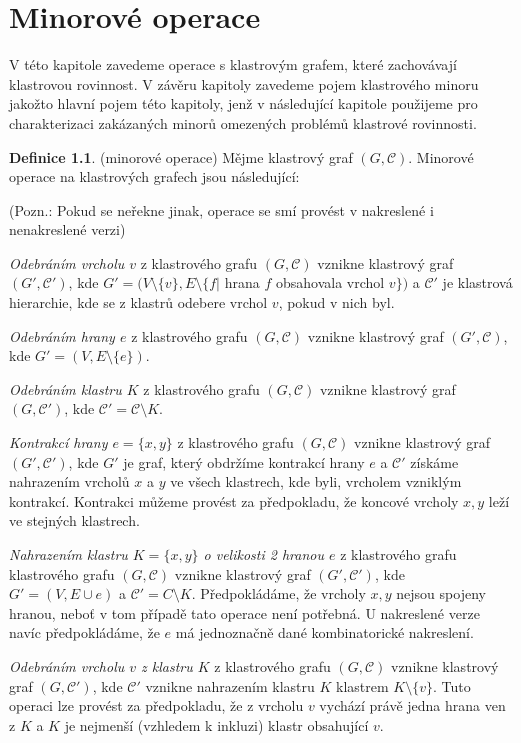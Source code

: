 \documentclass[12pt,a4report]{report}
\theoremstyle{definition}
\newtheorem{defn}[theorem]{Definice}
\begin{document}
\author{Filip Šedivý}

\chapter{Minorové operace}

V této kapitole zavedeme operace s klastrovým grafem, které zachovávají klastrovou rovinnost. V závěru kapitoly zavedeme pojem klastrového minoru jakožto hlavní pojem této kapitoly, jenž v následující kapitole použijeme pro charakterizaci zakázaných minorů omezených problémů klastrové rovinnosti.

\begin{defn} (minorové operace) Mějme klastrový graf $(G, \mathcal C)$. Minorové operace na klastrových grafech jsou následující:

(Pozn.: Pokud se neřekne jinak, operace se smí provést v nakreslené i nenakreslené verzi)

\textit{Odebráním vrcholu $v$} z klastrového grafu $(G, \mathcal C)$ vznikne klastrový graf  $(G', \mathcal C')$, kde  $G' = (V \setminus \{v\}, E \setminus \{f |$ hrana $f$ obsahovala vrchol $v\})$ a $\mathcal C'$ je klastrová hierarchie, kde se z klastrů odebere vrchol $v$, pokud v nich byl.

\textit{Odebráním hrany $e$} z klastrového grafu $(G, \mathcal C)$ vznikne klastrový graf  $(G', \mathcal C)$, kde $G' =  (V,E \setminus \{e\})$.

\textit{Odebráním klastru $K$} z klastrového grafu $(G, \mathcal C)$ vznikne klastrový graf  $(G, \mathcal C')$, kde $\mathcal C' = \mathcal C \setminus K$.

\textit{Kontrakcí hrany $e=\{x,y\}$} z klastrového grafu $(G, \mathcal C)$ vznikne klastrový graf  $(G', \mathcal C')$, kde $G'$ je graf, který obdržíme kontrakcí hrany $e$ a $\mathcal C'$ získáme nahrazením vrcholů $x$ a $y$ ve všech klastrech, kde byli, vrcholem vzniklým kontrakcí. Kontrakci můžeme provést za předpokladu, že koncové vrcholy $x, y$ leží ve stejných klastrech.

\textit{Nahrazením klastru $K=\{x,y\}$ o velikosti 2 hranou $e$} z klastrového grafu klastrového grafu $(G, \mathcal C)$ vznikne klastrový graf  $(G', \mathcal C')$, kde $G'=(V,E \cup e)$ a $\mathcal C'= C \setminus K$. Předpokládáme, že vrcholy $x, y$ nejsou spojeny hranou, neboť v tom případě tato operace není potřebná. U nakreslené verze navíc předpokládáme, že $e$ má jednoznačně dané kombinatorické nakreslení.

\textit{Odebráním vrcholu $v$ z klastru $K$} z klastrového grafu $(G, \mathcal C)$ vznikne klastrový graf  $(G, \mathcal C')$, kde $\mathcal C'$ vznikne nahrazením klastru $K$ klastrem $K \setminus \{v\}$. Tuto operaci lze provést za předpokladu, že z vrcholu $v$ vychází právě jedna hrana ven z $K$ a $K$ je nejmenší (vzhledem k inkluzi) klastr obsahující $v$.


\end{defn}
\end{document}
